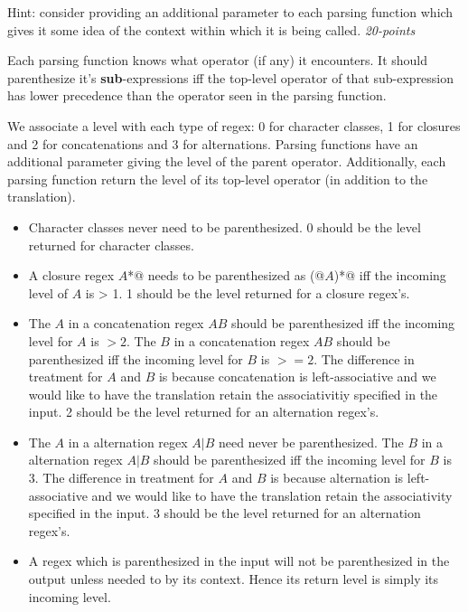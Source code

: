 \documentclass[12pt]{article}
\begin{document}
\begin{enumerate}
  Hint: consider providing an additional parameter to each parsing
  function which gives it some idea of the context within which it is
  being called.  \hfill\textit{20-points}

  Each parsing function knows what operator (if any) it encounters.
  It should parenthesize it's \textbf{sub}-expressions iff the
  top-level operator of that sub-expression has lower precedence
  than the operator seen in the parsing function.

  We associate a level with each type of regex: 0 for character
  classes, 1 for closures and 2 for concatenations and 3 for
  alternations.  Parsing functions have an additional parameter giving
  the level of the parent operator.  Additionally, each parsing
  function return the level of its top-level operator (in addition to
  the translation).

  \begin{itemize}

  \item Character classes never need to be parenthesized.  0 should
    be the level returned for character classes.
    

  \item A closure regex $A$\verb@*@ needs to be parenthesized
    as \verb@(@$A$\verb@)*@ iff the incoming level of $A$ is > 1.  1 should
    be the level returned for a closure regex's.

  \item The $A$ in a concatenation regex $AB$ should be parenthesized
    iff the incoming level for $A$ is $> 2$.  The $B$ in a
    concatenation regex $AB$ should be parenthesized iff the incoming
    level for $B$ is $>= 2$. The difference in treatment for $A$ and
    $B$ is because concatenation is left-associative and we would like
    to have the translation retain the associativitiy specified in the
    input.  2 should be the level returned for an alternation regex's.

  \item The $A$ in a alternation regex $A|B$ need never be parenthesized.
    The $B$ in a
    alternation regex $A|B$ should be parenthesized iff the incoming
    level for $B$ is 3.  The difference in treatment for $A$ and
    $B$ is because alternation is left-associative and we would like
    to have the translation retain the associativity specified in the
    input.  3 should be the level returned for an alternation regex's.

  \item A regex which is parenthesized in the input will not be
    parenthesized in the output unless needed to by its context.
    Hence its return level is simply its incoming level.
    



\end{itemize}
\end{enumerate}
\end{document}
